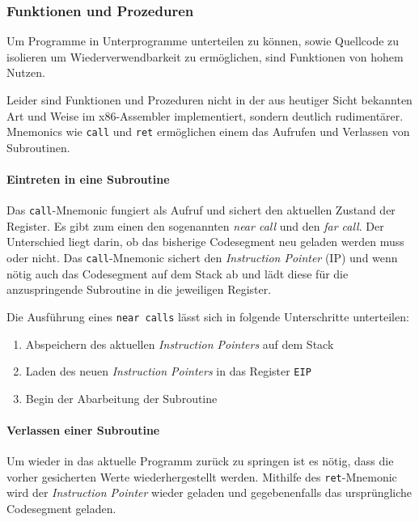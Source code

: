 \subsubsection{Funktionen und Prozeduren}

Um Programme in Unterprogramme unterteilen zu können, sowie Quellcode zu isolieren um Wiederverwendbarkeit zu ermöglichen, sind Funktionen von hohem Nutzen.\cite[S. 179]{intelmanual}

Leider sind Funktionen und Prozeduren nicht in der aus heutiger Sicht bekannten Art und Weise im x86-Assembler implementiert, sondern deutlich rudimentärer.
Mnemonics wie \texttt{call} und \texttt{ret} ermöglichen einem das Aufrufen und Verlassen von Subroutinen.

\paragraph{Eintreten in eine Subroutine}
Das \texttt{call}-Mnemonic fungiert als Aufruf und sichert den aktuellen Zustand der Register.
Es gibt zum einen den sogenannten \textit{near call} und den \textit{far call}.
Der Unterschied liegt darin, ob das bisherige Codesegment neu geladen werden muss oder nicht.
Das \texttt{call}-Mnemonic sichert den \textit{Instruction Pointer} (IP) und wenn nötig auch das Codesegment auf dem Stack ab und lädt diese für die anzuspringende Subroutine in die jeweiligen Register.

Die Ausführung eines \texttt{near calls} lässt sich in folgende Unterschritte unterteilen:

\begin{enumerate}
	\item Abspeichern des aktuellen \textit{Instruction Pointers} auf dem Stack
	\item Laden des neuen \textit{Instruction Pointers} in das Register \texttt{EIP}
	\item Begin der Abarbeitung der Subroutine	
\end{enumerate}

\paragraph{Verlassen einer Subroutine}

Um wieder in das aktuelle Programm zurück zu springen ist es nötig, dass die vorher gesicherten Werte wiederhergestellt werden.
Mithilfe des \texttt{ret}-Mnemonic wird der \textit{Instruction Pointer} wieder geladen und gegebenenfalls das ursprüngliche Codesegment geladen.

